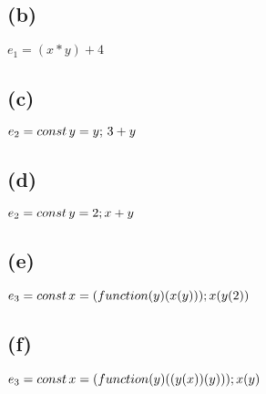 \documentclass[11pt, oneside]{article}
\newcommand{\forceindent}{\leavevmode{\parindent=1.5em\indent}}
\begin{document}
\subsection*{(b)}
\forceindent \par $e_1 = (x * y) + 4$

\subsection*{(c)}
\forceindent \par $e_2 = const \thinspace y = y; \thinspace 3 + y$

\subsection*{(d)}
\forceindent \par $e_2 = const \thinspace y = 2; x + y$

\subsection*{(e)}
\forceindent \par $e_3 = const \thinspace x = (function (y) (x(y))); x(y(2))$

\subsection*{(f)}
\forceindent \par $e_3 = const \thinspace x = (function (y) ((y(x))(y))); x(y)$
\end{document}
